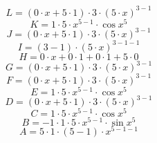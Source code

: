 \documentclass[12pt]{article}
\begin{document}
\begin{equation}
	L = 
\left( 0\cdot x + 5\cdot 1\right) \cdot 3\cdot \left( 5\cdot x\right) ^{3 - 1}
\end{equation}
\begin{equation}
	K = 
1\cdot 5\cdot x^{5 - 1}\cdot \cos {x^{5}}
\end{equation}
\begin{equation}
	J = 
\left( 0\cdot x + 5\cdot 1\right) \cdot 3\cdot \left( 5\cdot x\right) ^{3 - 1}
\end{equation}
\begin{equation}
	I = 
\left( 3 - 1\right) \cdot \left( 5\cdot x\right) ^{3 - 1 - 1}
\end{equation}
\begin{equation}
	H = 
0\cdot x + 0\cdot 1 + 0\cdot 1 + 5\cdot 0
\end{equation}
\begin{equation}
	G = 
\left( 0\cdot x + 5\cdot 1\right) \cdot 3\cdot \left( 5\cdot x\right) ^{3 - 1}
\end{equation}
\begin{equation}
	F = 
\left( 0\cdot x + 5\cdot 1\right) \cdot 3\cdot \left( 5\cdot x\right) ^{3 - 1}
\end{equation}
\begin{equation}
	E = 
1\cdot 5\cdot x^{5 - 1}\cdot \cos {x^{5}}
\end{equation}
\begin{equation}
	D = 
\left( 0\cdot x + 5\cdot 1\right) \cdot 3\cdot \left( 5\cdot x\right) ^{3 - 1}
\end{equation}
\begin{equation}
	C = 
1\cdot 5\cdot x^{5 - 1}\cdot \cos {x^{5}}
\end{equation}
\begin{equation}
	B = 
-1\cdot 1\cdot 5\cdot x^{5 - 1}\cdot \sin {x^{5}}
\end{equation}
\begin{equation}
	A = 
5\cdot 1\cdot \left( 5 - 1\right) \cdot x^{5 - 1 - 1}
\end{equation}
\end{document}
